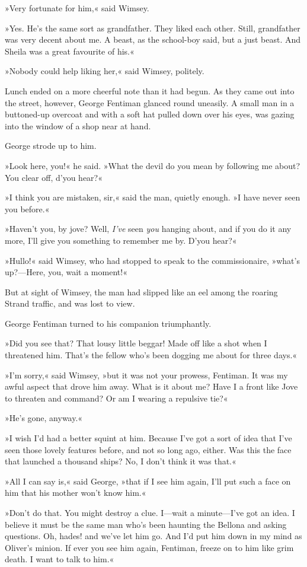 »Very fortunate for him,« said Wimsey.

»Yes. He's the same sort as grandfather. They liked each other. Still, grandfather was very decent about me. A beast, as the school-boy said, but a just beast. And Sheila was a great favourite of his.«

»Nobody could help liking her,« said Wimsey, politely.

Lunch ended on a more cheerful note than it had begun. As they came out into the street, however, George Fentiman glanced round uneasily. A small man in a buttoned-up overcoat and with a soft hat pulled down over his eyes, was gazing into the window of a shop near at hand.

George strode up to him.

»Look here, you!« he said. »What the devil do you mean by following me about? You clear off, d'you hear?«

»I think you are mistaken, sir,« said the man, quietly enough. »I have never seen you before.«

»Haven't you, by jove? Well, \textit{I've} seen \textit{you} hanging about, and if you do it any more, I'll give you something to remember me by. D'you hear?«

»Hullo!« said Wimsey, who had stopped to speak to the commissionaire, »what's up?---Here, you, wait a moment!«

But at sight of Wimsey, the man had slipped like an eel among the roaring Strand traffic, and was lost to view.

George Fentiman turned to his companion triumphantly.

»Did you see that? That lousy little beggar! Made off like a shot when I threatened him. That's the fellow who's been dogging me about for three days.«

»I'm sorry,« said Wimsey, »but it was not your prowess, Fentiman. It was my awful aspect that drove him away. What is it about me? Have I a front like Jove to threaten and command? Or am I wearing a repulsive tie?«

»He's gone, anyway.«

»I wish I'd had a better squint at him. Because I've got a sort of idea that I've seen those lovely features before, and not so long ago, either. Was this the face that launched a thousand ships? No, I don't think it was that.«

»All I can say is,« said George, »that if I see him again, I'll put such a face on him that his mother won't know him.«

»Don't do that. You might destroy a clue. I\allowbreak---\allowbreak wait a minute\allowbreak---\allowbreak I've got an idea. I believe it must be the same man who's been haunting the Bellona and asking questions. Oh, hades! and we've let him go. And I'd put him down in my mind as Oliver's minion. If ever you see him again, Fentiman, freeze on to him like grim death. I want to talk to him.«